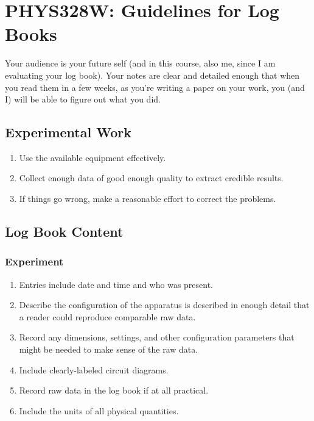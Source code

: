 \documentclass[11 pt]{article}
\begin{document}
\section*{PHYS328W: Guidelines for Log Books}

Your audience is your future self (and in this course, also me, since
I am evaluating your log book). Your notes are clear and detailed
enough that when you read them in a few weeks, as you're writing a
paper on your work, you (and I) will be able to figure out what you
did.

\subsection*{Experimental Work}
\begin{enumerate}
  \item Use the available equipment effectively.

  \item Collect enough data of good enough quality to extract credible
    results.

  \item If things go wrong, make a reasonable effort to correct
    the problems.
\end{enumerate}
  
\subsection*{Log Book Content}
\subsubsection*{Experiment}
\begin{enumerate}
\item Entries include date and time and who was present.

\item Describe the configuration of the apparatus is described in enough 
  detail that a reader could reproduce comparable raw data.

\item Record any dimensions, settings, and other configuration
  parameters that might be needed to make sense of the raw data.

\item Include clearly-labeled circuit diagrams.

\item Record raw data in the log book if at all practical.

\item Include the units of all physical quantities.
\end{enumerate}
\end{document}

